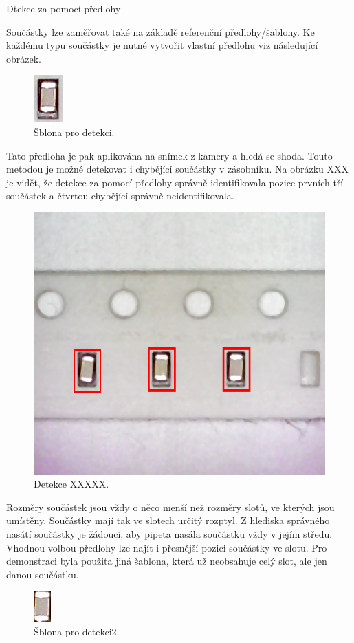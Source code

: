 Dtekce za pomocí předlohy

Součástky lze zaměřovat také na základě referenční předlohy/šablony. Ke každému typu součástky je nutné vytvořit vlastní předlohu viz následující obrázek.

\begin{figure}[h!]
  \centering
    \includegraphics[width=0.1\linewidth]{obrazky/template.png}%
    \caption{Šblona pro detekci.}
    \label{fig:template}
\end{figure}

Tato předloha je pak aplikována na snímek z kamery a hledá se shoda. Touto metodou je možné detekovat i chybějící součástky v zásobníku. Na obrázku XXX je vidět, že detekce za pomocí předlohy správně identifikovala pozice prvních tří součástek a čtvrtou chybějící správně neidentifikovala.
\begin{figure}[h!]
  \centering
    \includegraphics[width=0.5\linewidth]{obrazky/res2.png}%
    \caption{Detekce XXXXX.}
    \label{fig:tape3}
\end{figure}


Rozměry součástek jsou vždy o něco menší než rozměry slotů, ve kterých jsou umístěny. Součástky mají tak ve slotech určitý rozptyl. Z hlediska správného nasátí součástky je žádoucí, aby pipeta nasála součástku vždy v jejím středu. Vhodnou volbou předlohy lze najít i přesnější pozici součástky ve slotu.
Pro demonstraci byla použita jiná šablona, která už neobsahuje celý slot, ale jen danou součástku.
\begin{figure}[h!]
  \centering
    \includegraphics[width=0.1\linewidth]{obrazky/template2.png}%
    \caption{Šblona pro detekci2.}
    \label{fig:template2}
\end{figure}


